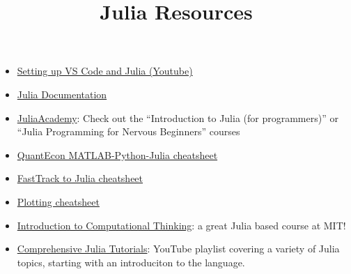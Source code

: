 \documentclass[
  ignorenonframetext,
  aspectratio=169,
]{beamer}
\title{\texorpdfstring{Julia Resources}{Julia Resources}}
\author{}
\date{}
\providecommand{\tightlist}{%
  \setlength{\itemsep}{0pt}\setlength{\parskip}{0pt}}
\begin{document}
\frame{\titlepage}


\begin{frame}
\begin{itemize}
\tightlist
\item
  \href{https://www.youtube.com/watch?v=KesuPOlBB_o}{Setting up VS Code
  and Julia (Youtube)}
\item
  \href{https://docs.julialang.org/en/v1/}{Julia Documentation}
\item
  \href{https://juliaacademy.com/courses}{JuliaAcademy}: Check out the
  ``Introduction to Julia (for programmers)'' or ``Julia Programming for
  Nervous Beginners'' courses
\item
  \href{https://cheatsheets.quantecon.org/}{QuantEcon
  MATLAB-Python-Julia cheatsheet}
\item
  \href{https://juliadocs.github.io/Julia-Cheat-Sheet/}{FastTrack to
  Julia cheatsheet}
\item
  \href{https://github.com/sswatson/cheatsheets/blob/master/plotsjl-cheatsheet.pdf}{Plotting
  cheatsheet}
\item
  \href{https://computationalthinking.mit.edu/Spring21/}{Introduction to
  Computational Thinking}: a great Julia based course at MIT!
\item
  \href{https://www.youtube.com/playlist?list=PLCXbkShHt01seTlnlVg6O7f6jKGTguFi7}{Comprehensive
  Julia Tutorials}: YouTube playlist covering a variety of Julia topics,
  starting with an introduciton to the language.
\end{itemize}
\end{frame}
\end{document}
